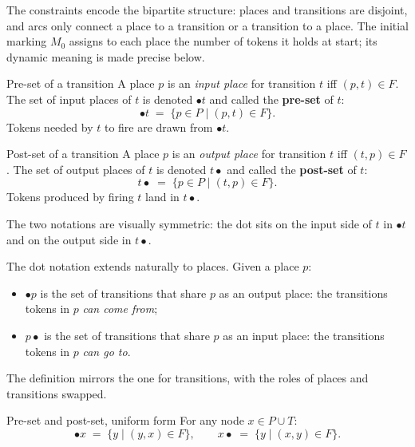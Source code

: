 The constraints encode the bipartite structure: places and transitions are disjoint, and arcs only connect a place to a transition or a transition to a place. The initial marking $M_0$ assigns to each place the number of tokens it holds at start; its dynamic meaning is made precise below.

\begin{definitionbox}{Pre-set of a transition}
A place $p$ is an \emph{input place} for transition $t$ iff $(p, t) \in F$. The set of input places of $t$ is denoted $\bullet t$ and called the \textbf{pre-set} of $t$:
\[
  \bullet t \;=\; \{ p \in P \mid (p,t) \in F \}.
\]
Tokens needed by $t$ to fire are drawn from $\bullet t$.
\end{definitionbox}

\begin{definitionbox}{Post-set of a transition}
A place $p$ is an \emph{output place} for transition $t$ iff $(t, p) \in F$. The set of output places of $t$ is denoted $t \bullet$ and called the \textbf{post-set} of $t$:
\[
  t \bullet \;=\; \{ p \in P \mid (t,p) \in F \}.
\]
Tokens produced by firing $t$ land in $t \bullet$.
\end{definitionbox}

The two notations are visually symmetric: the dot sits on the input side of $t$ in $\bullet t$ and on the output side in $t \bullet$.

The dot notation extends naturally to places. Given a place $p$:

\begin{itemize}
  \item $\bullet p$ is the set of transitions that share $p$ as an output place: the transitions tokens in $p$ \emph{can come from};
  \item $p \bullet$ is the set of transitions that share $p$ as an input place: the transitions tokens in $p$ \emph{can go to}.
\end{itemize}

The definition mirrors the one for transitions, with the roles of places and transitions swapped.

\begin{definitionbox}{Pre-set and post-set, uniform form}
For any node $x \in P \cup T$:
\[
  \bullet x \;=\; \{ y \mid (y,x) \in F \}, \qquad x \bullet \;=\; \{ y \mid (x,y) \in F \}.
\]
\end{definitionbox}

